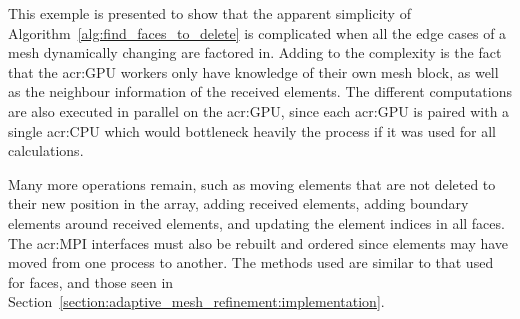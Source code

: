 This exemple is presented to show that the apparent simplicity of
Algorithm~\ref{alg:find_faces_to_delete} is complicated when all the edge cases of a mesh
dynamically changing are factored in. Adding to the complexity is the fact that the
\acrshort{acr:GPU} workers only have knowledge of their own mesh block, as well as the neighbour
information of the received elements. The different computations are also executed in parallel on
the \acrshort{acr:GPU}, since each \acrshort{acr:GPU} is paired with a single \acrshort{acr:CPU}
which would bottleneck heavily the process if it was used for all calculations.

Many more operations remain, such as moving elements that are not deleted to their new position in
the array, adding received elements, adding boundary elements around received elements, and updating
the element indices in all faces. The \acrshort{acr:MPI} interfaces must also be rebuilt and ordered
since elements may have moved from one process to another. The methods used are similar to that used
for faces, and those seen in Section~\ref{section:adaptive_mesh_refinement:implementation}. 

